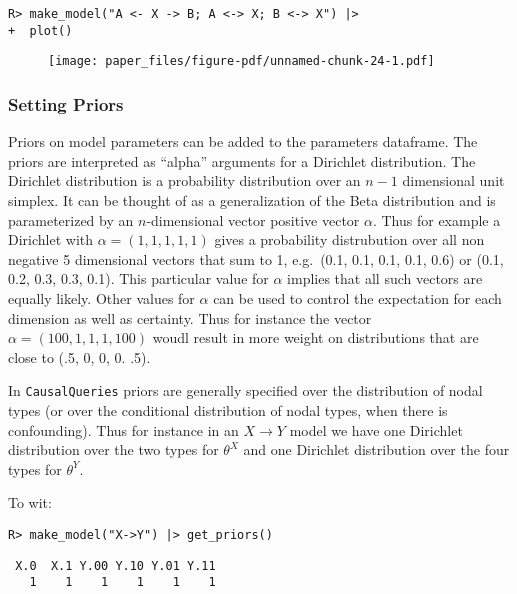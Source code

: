 \documentclass[
  11pt,
  article]{jss}
\begin{document}
\begin{verbatim}
R> make_model("A <- X -> B; A <-> X; B <-> X") |> 
+  plot()
\end{verbatim}

\begin{figure}[H]

{\centering \texttt{[image: paper\_files/figure-pdf/unnamed-chunk-24-1.pdf]}

}

\end{figure}

\hypertarget{priors}{%
\subsubsection{Setting Priors}\label{priors}}

Priors on model parameters can be added to the parameters dataframe. The
priors are interpreted as ``alpha'' arguments for a Dirichlet
distribution. The Dirichlet distribution is a probability distribution
over an \(n-1\) dimensional unit simplex. It can be thought of as a
generalization of the Beta distribution and is parameterized by an
\(n\)-dimensional vector positive vector \(\alpha\). Thus for example a
Dirichlet with \(\alpha = (1, 1, 1, 1, 1)\) gives a probability
distrubution over all non negative 5 dimensional vectors that sum to 1,
e.g.~(0.1, 0.1, 0.1, 0.1, 0.6) or (0.1, 0.2, 0.3, 0.3, 0.1). This
particular value for \(\alpha\) implies that all such vectors are
equally likely. Other values for \(\alpha\) can be used to control the
expectation for each dimension as well as certainty. Thus for instance
the vector \(\alpha = (100, 1, 1, 1, 100)\) woudl result in more weight
on distributions that are close to (.5, 0, 0, 0. .5).

In \texttt{CausalQueries} priors are generally specified over the
distribution of nodal types (or over the conditional distribution of
nodal types, when there is confounding). Thus for instance in an
\(X \rightarrow Y\) model we have one Dirichlet distribution over the
two types for \(\theta^X\) and one Dirichlet distribution over the four
types for \(\theta^Y\).

To wit:

\begin{verbatim}
R> make_model("X->Y") |> get_priors()
\end{verbatim}

\begin{verbatim}
 X.0  X.1 Y.00 Y.10 Y.01 Y.11 
   1    1    1    1    1    1 
\end{verbatim}
\end{document}
